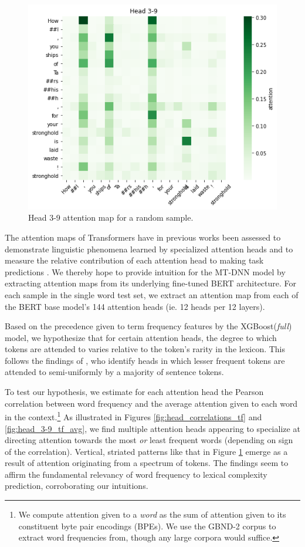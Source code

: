 \documentclass[11pt,a4paper]{article}
\begin{document}
\begin{figure}
  \centering
  \includegraphics[scale=0.45]{head_3-9.png}
  \captionsetup{justification=centering}
  \caption{\label{fig:head_3-9} Head 3-9 attention map for a random sample.}
\end{figure}

The attention maps of Transformers have in previous works been assessed to demonstrate linguistic phenomena learned by specialized attention heads \citep{1905-09418, 1906-04341} and to measure the relative contribution of each attention head to making task predictions \citep{1905-09418, 1905-10650}. We thereby hope to provide intuition for the MT-DNN model by extracting attention maps from its underlying fine-tuned BERT architecture. For each sample in the single word test set, we extract an attention map from each of the BERT base model's 144 attention heads (ie. 12 heads per 12 layers).

Based on the precedence given to term frequency features by the XGBoost(\textit{full}) model, we hypothesize that for certain attention heads, the degree to which tokens are attended to varies relative to the token's rarity in the lexicon. This follows the findings of \citealp{1905-09418}, who identify heads in which lesser frequent tokens are attended to semi-uniformly by a majority of sentence tokens. 

To test our hypothesis, we estimate for each attention head the Pearson correlation between word frequency and the average attention given to each word in the context.\footnote{We compute attention given to a \textit{word} as the sum of attention given to its constituent byte pair encodings (BPEs). We use the GBND-2 corpus to extract word frequencies from, though any large corpora would suffice.} As illustrated in Figures \ref{fig:head_correlations_tf} and \ref{fig:head_3-9_tf_avg}, we find multiple attention heads appearing to specialize at directing attention towards the most \textit{or} least frequent words (depending on sign of the correlation). Vertical, striated patterns like that in Figure \ref{fig:head_3-9} emerge as a result of attention originating from a spectrum of tokens. The findings seem to affirm the fundamental relevancy of word frequency to lexical complexity prediction, corroborating our intuitions.
\end{document}
